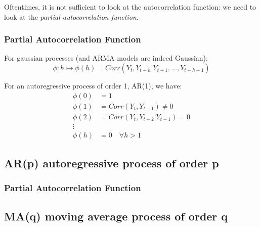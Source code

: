             Oftentimes, it is not sufficient to look at the autocorrelation function: we need to look at the \textit{partial autocorrelation function}.

        \subsubsection{Partial Autocorrelation Function}

            \begin{definition}
                For gaussian processes (and ARMA models are indeed Gaussian):
                \begin{equation}
                    \phi:h \mapsto \phi(h) = Corr(Y_t, Y_{t+h} | Y_{t+1}, \ldots, Y_{t+h-1})
                \end{equation}
            \end{definition}

            \begin{example}
                For an autoregressive process of order 1, AR(1), we have:
                \begin{align}
                    \phi(0) &= 1 \\
                    \phi(1) &= Corr(Y_t, Y_{t-1}) \neq 0 \\
                    \phi(2) &= Corr(Y_t, Y_{t-2} | Y_{t-1}) = 0 \\
                    \vdots & \\
                    \phi(h) &= 0 \quad \forall h > 1
                \end{align}
            \end{example}

    \subsection{AR(p) autoregressive process of order p}

        \subsubsection{Partial Autocorrelation Function}

            \begin{definition}
            
            \end{definition}

    \subsection{MA(q) moving average process of order q}

